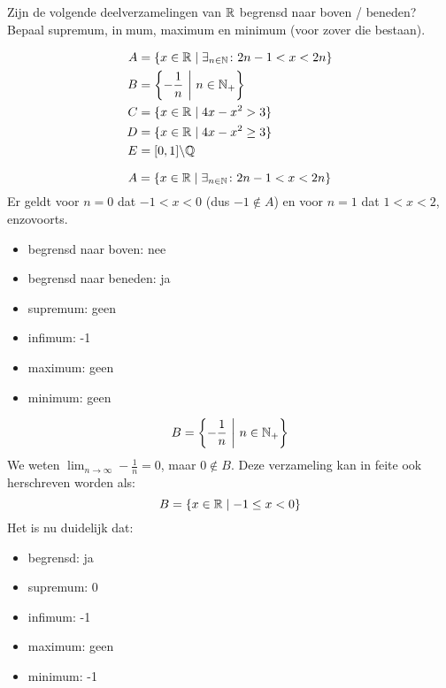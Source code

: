 \documentclass[week=1]{homework}
\date{\today}
\begin{document}
    \maketitle
    \thispagestyle{empty}
    \newpage
    \begin{questions}
		\let\firstquestion\question
		\renewcommand*{\question}{\vspace{7mm}\firstquestion}
        \firstquestion
        
        Zijn de volgende deelverzamelingen van $\mathbb{R}$ begrensd naar boven / beneden?
        Bepaal supremum, inmum, maximum en minimum (voor zover die bestaan).
        
        \begin{align*}
        	A &= \{ x \in \mathbb{R} \mid \exists_{n \in \mathbb{N}} \colon 2n-1 < x < 2n \} \\
        	B &= \left\{ - \frac{1}{n} \ \middle| \ n \in \mathbb{N}_+ \right\} \\
        	C &= \{ x \in \mathbb{R} \mid 4x - x^2 > 3 \} \\
        	D &= \{ x \in \mathbb{R} \mid 4x - x^2 \geq 3 \} \\
        	E &= [0,1]\backslash \mathbb{Q}
        \end{align*}
        
        \[
	        A = \{ x \in \mathbb{R} \mid \exists_{n \in \mathbb{N}} \colon 2n-1 < x < 2n \}
        \]
		Er geldt voor $n=0$ dat $-1 < x < 0$ (dus $-1 \not \in A$) en voor $n=1$ dat $1 < x < 2$, enzovoorts.
		      \begin{itemize}
		      	\item begrensd naar boven: nee
		      	\item begrensd naar beneden: ja 
		      	\item supremum: geen
		      	\item infimum: -1
		      	\item maximum: geen
		      	\item minimum: geen
		      \end{itemize}
		              
        \[
	        B = \left\{ - \frac{1}{n} \ \middle| \ n \in \mathbb{N}_+ \right\}
        \]
        We weten $\lim_{n \to \infty} -\frac{1}{n} = 0$, maar $0 \not \in B$. Deze verzameling kan in feite ook herschreven worden als:
        \[
	        B = \{x \in \mathbb{R} \mid -1 \le x < 0 \}
        \]
        Het is nu duidelijk dat:
              \begin{itemize}
              	\item begrensd: ja
              	\item supremum: 0
              	\item infimum: -1
              	\item maximum: geen
              	\item minimum: -1
              \end{itemize}
              

\end{questions}
\end{document}
